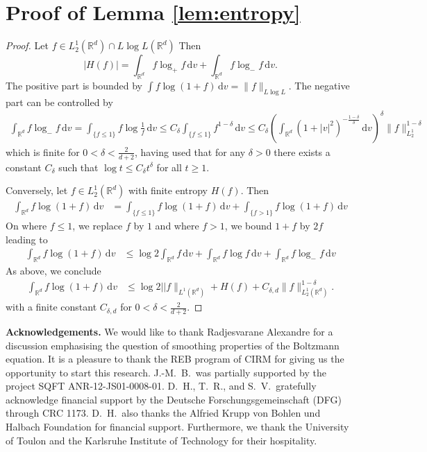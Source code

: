 \documentclass[11pt,a4paper,reqno]{amsart}
\theoremstyle{plain}
\theoremstyle{definition}
\begin{document}
\section{Proof of Lemma \ref{lem:entropy}}\label{sec:appendix-LlogL}
\begin{proof}
	Let $f\in L^1_2({\mathbb{R}}^d)\cap L\log L({\mathbb{R}}^d)$ Then
	\begin{equation*}
		|H(f)| = \int_{{\mathbb{R}}^d} f \log_+ f \, \mathrm{d}v + \int_{{\mathbb{R}}^d} f\log_- f \,\mathrm{d}v.
	\end{equation*}
	The positive part is bounded by $\int f\log(1+f)\,\mathrm{d}v = \|f\|_{L\log L}$. The negative part can be controlled by
	\begin{align*}
		\int_{{\mathbb{R}}^d} f\log_- f\,\mathrm{d}v = \int_{\{f\leq 1\}}f\log \frac{1}{f}\,\mathrm{d}v \leq C_{\delta} \int_{\{f\leq 1\}} f^{1-\delta} \,\mathrm{d}v \leq C_{\delta} \left(\int_{{\mathbb{R}}^d} (1+|v|^2)^{-\frac{1-\delta}{\delta}} \,\mathrm{d}v\right)^{\delta} \|f\|_{L^1_2}^{1-\delta}
	\end{align*}
	which is finite for $0<\delta<\frac{2}{d+2}$, having used that for any $\delta>0$ there exists a constant $C_{\delta}$ such that $\log t \leq C_{\delta}t^{\delta}$ for all $t\geq 1$.

	Conversely, let $f\in L^1_2({\mathbb{R}}^d)$ with finite entropy $H(f)$. Then
	\begin{align*}
		\int_{{\mathbb{R}}^d} f \log(1+f) \,\mathrm{d}v
		&=
		\int_{\{f\le 1\}} f \log(1+f) \,\mathrm{d}v
		+\int_{\{f>1\}} f \log(1+f) \,\mathrm{d}v
	\end{align*}
	On where $f\le 1$, we replace $f$ by $1$ and where $f>1$, we bound $1+f$ by $2f$
	leading to
	 	\begin{align*}
		\int_{{\mathbb{R}}^d} f \log(1+f) \,\mathrm{d}v
		&\leq
		\log2 \int_{{\mathbb{R}}^d} f \,\mathrm{d}v
		+\int_{{\mathbb{R}}^d} f \log f  \,\mathrm{d}v
		+  \int_{{\mathbb{R}}^d} f \log_- f  \,\mathrm{d}v
	\end{align*}
	As above, we conclude
	 \begin{align}\label{eq:LlogL}
		\int_{{\mathbb{R}}^d} f \log(1+f) \,\mathrm{d}v
		&\leq
		\log2 ||f\|_{L^1({\mathbb{R}}^d)} + H(f) +  C_{\delta,d} \|f\|_{L^1_2({\mathbb{R}}^d)}^{1-\delta}.
	\end{align}
	with a finite constant $C_{\delta,d}$ for $0<\delta<\frac{2}{d+2}$.
\end{proof}

\bigskip
\noindent\textbf{Acknowledgements.} We would like to thank Radjesvarane Alexandre for a discussion emphasising the question of smoothing properties of the  Boltzmann equation. It is a pleasure to  thank the REB program of CIRM for giving us the opportunity to start this research.
	J.-M.~B.\ was partially supported by the project SQFT ANR-12-JS01-0008-01. D.~H., T.~R., and S.~V.\ gratefully acknowledge financial support by the Deutsche Forschungsgemeinschaft (DFG) through CRC 1173. D.~H.\ also thanks the Alfried Krupp von Bohlen und Halbach Foundation for financial support.
	Furthermore, we thank the University of Toulon and the Karlsruhe Institute of Technology for their hospitality.
\end{document}
